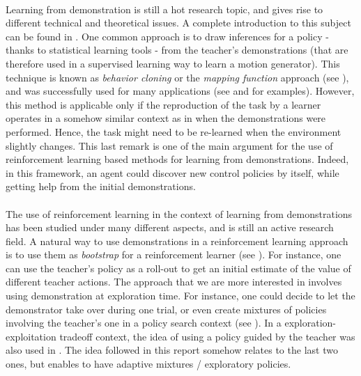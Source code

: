 \documentclass[a4paper]{report}
\begin{document}
{{			\paragraph{} Learning from demonstration is still a hot research topic, and gives rise to different technical and theoretical issues. A complete introduction to this subject can be found in \cite{Billard2016}.  One common approach is to draw inferences for a policy - thanks to statistical learning tools - from the teacher's demonstrations (that are therefore used in a supervised learning way to learn a motion generator). This technique is known as \emph{behavior cloning} or the \emph{mapping function} approach (see \cite{argall2009survey}), and was successfully used for many applications (see \cite{hovland1996skill} and \cite{mataric2002} for examples). However, this method is applicable only if the reproduction of the task by a learner operates in a somehow similar context as in when the demonstrations were performed. Hence, the task might need to be re-learned when the environment slightly changes. This last remark is one of the main argument for the use of reinforcement learning based methods for learning from demonstrations. Indeed, in this framework, an agent could discover new control policies by itself, while getting help from the initial demonstrations. 
			
			\paragraph{} The use of reinforcement learning in the context of learning from demonstrations has been studied under many different aspects, and is still an active research field.  A natural way to use demonstrations in a reinforcement learning approach is to use them as \emph{bootstrap} for a reinforcement learner (see \cite{Billard2016}). For instance, one can use the teacher's policy as a roll-out to get an initial estimate of the value of different teacher actions. The approach that we are more interested in involves using demonstration at exploration time. For instance, one could decide to let the demonstrator take over during one trial, or even create mixtures of policies involving the teacher's one in a policy search context (see \cite{ross2011reduction}). In a exploration-exploitation tradeoff context, the idea of using a policy guided by the teacher was also used in \cite{chu2017analyzing}. The idea followed in this report somehow relates to the last two ones, but enables to have adaptive mixtures / exploratory policies. 
			
}}
\end{document}
